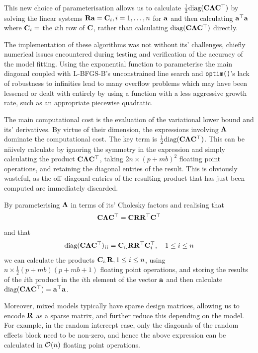 \noindent This new choice of parameterisation allows us to calculate
$\frac{1}{2} \text{diag}({\bf C} {\boldsymbol \Lambda} {\bf C}^\top)$ by solving the linear systems
${\bf R} {\bf a} = {\bf C}_{i}, i=1, \ldots, n$ for   ${\bf a}$ and then calculating
${\bf a}^\top{\bf a}$ where ${\bf C}_{i} = $ the $i$th row of ${\bf C}$, rather than
calculating $\text{diag}({\bf C} {\boldsymbol \Lambda} {\bf C}^\top)$ directly.
	
The implementation of these algorithms was not without its' challenges, chiefly numerical issues encountered during testing and verification of the accuracy of the model fitting. Using the exponential function to parameterise the main diagonal coupled with L-BFGS-B's unconstrained line search and \texttt{optim()}'s lack of robustness to infinities lead to many overflow problems which may have been lessened or dealt with entirely by using a function with a less aggressive growth rate, such as an appropriate piecewise quadratic.
	
The main computational cost is the evaluation of the variational lower bound and its' derivatives. By
virtue of their dimension, the expressions involving ${\boldsymbol \Lambda}$ dominate the computational cost. The key
term is $\frac{1}{2} \text{diag}({\bf C} {\boldsymbol \Lambda} {\bf C}^\top)$. This can be n\"aively calculate by ignoring the
symmetry in the expression and simply calculating the product ${\bf C} {\boldsymbol \Lambda} {\bf C}^\top$, taking $2 n
\times (p + m b)^2$ floating point operations, and retaining the diagonal entries of the result. This is
obviously wasteful, as the off--diagonal entries of the resulting product that has just been computed
are immediately discarded.
	
By parameterising ${\boldsymbol \Lambda}$ in terms of its' Cholesky factors and realising that
\begin{equation*}
	{\bf C} {\boldsymbol\Lambda} {\bf C}^\top = {\bf C} {\bf R} {\bf R}^\top {\bf C}^\top
\end{equation*}
\noindent and that
\begin{equation*}
	\text{diag}({\bf C} {\boldsymbol \Lambda} {\bf C}^\top)_{ii} = {\bf C}_{i .} {\bf R} {\bf R}^\top {\bf C}_{i .}^\top,\quad1 \leq i \leq n
\end{equation*}
\noindent we can calculate the products ${\bf C}_{i .} {\bf R}, 1 \leq i \leq n$, using $n \times \frac{1}{2}(p + m
b)(p + m b   + 1)$ floating point operations, and storing the results of the $i$th product in the $i$th
element of the   vector ${\bf a}$ and then calculate $\text{diag}({\bf C} {\boldsymbol \Lambda} {\bf C}^\top) = {\bf a}^\top {\bf a}$.
	
Moreover, mixed models typically have sparse design matrices, allowing us to encode ${\bf R}$ as a sparse matrix, and	further reduce   this depending on the model. For example, in the random intercept case, only the diagonals of the random effects block need to be non-zero, and hence the above expression can be calculated in
$\mathcal{O}(n)$ floating point operations.
	
